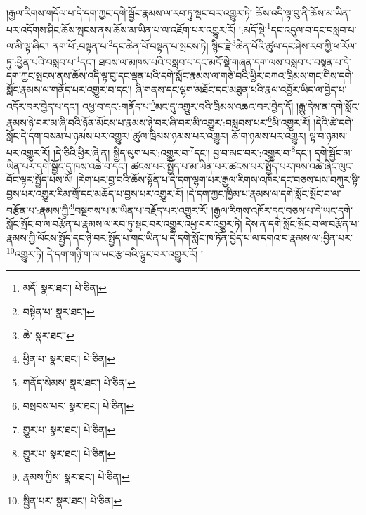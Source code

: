 །རྒྱལ་རིགས་གདོལ་པ་དེ་དག་ཀྱང་དགེ་སྦྱོང་རྣམས་ལ་རབ་ཏུ་སྡང་བར་འགྱུར་ཏེ། ཆོས་འདི་ལྟ་བུ་ནི་ཆོས་མ་ཡིན་པར་འདོགས་ཤིང་ཆོས་སྤངས་ནས་ཆོས་མ་ཡིན་པ་ལ་འཇོག་པར་འགྱུར་རོ། །:མདོ་སྡེ་\footnote{མདོ་  སྣར་ཐང་།  པེ་ཅིན། }དང་འདུལ་བ་དང་བསླབ་པ་ལ་མི་ལྟ་ཞིང་། ནག་པོ་:བསྟན་པ་\footnote{བསྟེན་པ་  སྣར་ཐང་། }དང་ཆེན་པོ་བསྟན་པ་སྤངས་ཏེ། སྙིང་རྗེ་\footnote{ཆེ་  སྣར་ཐང་། }ཆེན་པོའི་ཚུལ་དང་ཤེས་རབ་ཀྱི་ཕ་རོལ་ཏུ་:ཕྱིན་པའི་བསླབ་པ་\footnote{ཕྱིན་པ་  སྣར་ཐང་།  པེ་ཅིན། }དང་། ཐབས་ལ་མཁས་པའི་བསླབ་པ་དང་མདོ་སྡེ་གཞན་དག་ལས་བསླབ་པ་བསྟན་པ་དེ་དག་ཀྱང་སྤངས་ནས་ཆོས་འདི་ལྟ་བུ་དང་ལྡན་པའི་དགེ་སློང་རྣམས་ལ་གཙེ་བའི་ཕྱིར་བཀའ་ཁྲིམས་གང་གིས་དགེ་སློང་རྣམས་ལ་གནོད་པར་འགྱུར་བ་དང་། ཞི་གནས་དང་ལྷག་མཐོང་དང་མཐུན་པའི་རྣལ་འབྱོར་ཡིད་ལ་བྱེད་པ་འདོར་བར་བྱེད་པ་དང་། འཕྱ་བ་དང་:གནོད་པ་\footnote{གནོད་སེམས་  སྣར་ཐང་།  པེ་ཅིན། }མང་དུ་འགྱུར་བའི་ཁྲིམས་འཆའ་བར་བྱེད་དོ། །རྒྱུ་དེས་ན་དགེ་སློང་རྣམས་ཉེ་བར་མ་ཞི་བའི་ཉོན་མོངས་པ་རྣམས་ཉེ་བར་ཞི་བར་མི་འགྱུར་:བསླབས་པར་\footnote{བསྲབས་པར་  སྣར་ཐང་།  པེ་ཅིན། }མི་འགྱུར་རོ། །དེའི་ཚེ་དགེ་སློང་དེ་དག་བསམ་པ་ཉམས་པར་འགྱུར། ཚུལ་ཁྲིམས་ཉམས་པར་འགྱུར། ཆོ་ག་ཉམས་པར་འགྱུར། ལྟ་བ་ཉམས་པར་འགྱུར་རོ། །དེ་ཅིའི་ཕྱིར་ཞེ་ན། སྒྱིད་ལུག་པར་:འགྱུར་བ་\footnote{གྱུར་པ་  སྣར་ཐང་།  པེ་ཅིན། }དང་། བྱ་བ་མང་བར་:འགྱུར་བ་\footnote{གྱུར་པ་  སྣར་ཐང་།  པེ་ཅིན། }དང་། དགེ་སྦྱོང་མ་ཡིན་པར་དགེ་སྦྱོང་དུ་ཁས་འཆེ་བ་དང་། ཚངས་པར་སྤྱོད་པ་མ་ཡིན་པར་ཚངས་པར་སྤྱོད་པར་ཁས་འཆེ་ཞིང་ལུང་བོང་ལྟར་སྤྱོད་པས་སོ། །རེག་པར་བྱ་བའི་ཆོས་སྟོན་པ་དེ་དག་ལྷག་པར་རྒྱལ་རིགས་འཁོར་དང་བཅས་པས་བཀུར་སྟི་བྱས་པར་འགྱུར་རིམ་གྲོ་དང་མཆོད་པ་བྱས་པར་འགྱུར་རོ། །དེ་དག་ཀྱང་ཁྱིམ་པ་རྣམས་ལ་དགེ་སློང་སྤོང་བ་ལ་བརྩོན་པ་:རྣམས་ཀྱི་\footnote{རྣམས་ཀྱིས་  སྣར་ཐང་།  པེ་ཅིན། }བསྔགས་པ་མ་ཡིན་པ་བརྗོད་པར་འགྱུར་རོ། །རྒྱལ་རིགས་འཁོར་དང་བཅས་པ་དེ་ཡང་དགེ་སློང་སྤོང་བ་ལ་བརྩོན་པ་རྣམས་ལ་རབ་ཏུ་སྡང་བར་འགྱུར་འཕྱ་བར་འགྱུར་ཏེ། དེས་ན་དགེ་སློང་སྤོང་བ་ལ་བརྩོན་པ་རྣམས་ཀྱི་ལོངས་སྤྱོད་དང་ཉེ་བར་སྤྱོད་པ་གང་ཡིན་པ་དེ་དགེ་སློང་ཁ་ཏོན་བྱེད་པ་ལ་དགའ་བ་རྣམས་ལ་:བྱིན་པར་\footnote{སྦྱིན་པར་  སྣར་ཐང་།  པེ་ཅིན། }འགྱུར་ཏེ། དེ་དག་གཉི་ག་ལ་ཡང་རྩ་བའི་ལྟུང་བར་འགྱུར་རོ། །
